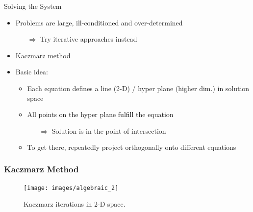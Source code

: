 \begin{frame}[c]{Solving the System}


	\begin{itemize}
		\setlength\itemsep{0.3cm}
		\item Problems are large, ill-conditioned and over-determined
		      \begin{itemize}
			      \item[$\Rightarrow$] Try iterative approaches instead
		      \end{itemize}
	\end{itemize}
	\vspace{1cm}

	\begin{itemize}
		\item Kaczmarz method
		\item Basic idea:
		      \begin{itemize}
			      \item Each equation defines a line (2-D) / hyper plane (higher dim.) in solution space
			      \item All points on the hyper plane fulfill the equation
			            \begin{itemize}
				            \item[$\Rightarrow$] Solution is in the point of intersection
			            \end{itemize}
			      \item To get there, repeatedly project orthogonally onto different equations
		      \end{itemize}

	\end{itemize}

\end{frame}

\begin{frame}
	\frametitle{Kaczmarz Method}

	\begin{figure}[tbp]
		\centering
		\texttt{[image: images/algebraic\_2]}
		\caption{Kaczmarz iterations in 2-D space.}
		\label{fig:ct_algebraic_2}
	\end{figure}

\end{frame}

